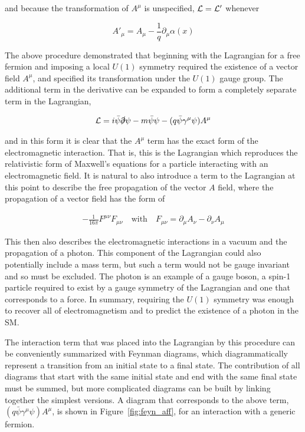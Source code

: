 \noindent and because the transformation of $A^\mu$ is unspecified, $\mathcal{L} = \mathcal{L}'$ whenever

\[  A'_\mu =  A_{\mu} - \frac{1}{q}\partial_\mu\alpha(x) \]

The above procedure demonstrated that beginning with the Lagrangian for a free fermion and imposing a local $U(1)$ symmetry required the existence of a vector field $A^\mu$, and specified its transformation under the $U(1)$ gauge group.
The additional term in the derivative can be expanded to form a completely separate term in the Lagrangian,

\begin{align}
\mathcal{L} = i\bar{\psi}\slashed{\partial}\psi -m\bar{\psi}\psi - (q\bar{\psi}\gamma^\mu\psi)A^\mu
\end{align}

\noindent and in this form it is clear that the $A^\mu$ term has the exact form of the electromagnetic interaction.
That is, this is the Lagrangian which reproduces the relativistic form of Maxwell's equations for a particle interacting with an electromagnetic field.
It is natural to also introduce a term to the Lagrangian at this point to describe the free propagation of the vector $A$ field, where the propagation of a vector field has the form of

\begin{align}
- \frac{1}{16\pi} F^{\mu\nu}F_{\mu\nu} \quad \mathrm{with} \quad F_{\mu\nu} = \partial_\mu A_\nu - \partial_\nu A_\mu
\end{align}

\noindent This then also describes the electromagnetic interactions in a vacuum and the propagation of a photon.
This component of the Lagrangian could also potentially include a mass term, but such a term would not be gauge invariant and so must be excluded.
The photon is an example of a gauge boson, a spin-1 particle required to exist by a gauge symmetry of the Lagrangian and one that corresponds to a force.
In summary, requiring the $U(1)$ symmetry was enough to recover all of electromagnetism and to predict the existence of a photon in the \ac{SM}. 

The interaction term that was placed into the Lagrangian by this procedure can be conveniently summarized with Feynman diagrams, which diagrammatically represent a transition from an initial state to a final state.
The contribution of all diagrams that start with the same initial state and end with the same final state must be summed, but more complicated diagrams can be built by linking together the simplest versions.
A diagram that corresponds to the above term, $(q\bar{\psi}\gamma^\mu\psi)A^\mu$, is shown in Figure~\ref{fig:feyn_aff}, for an interaction with a generic fermion.

